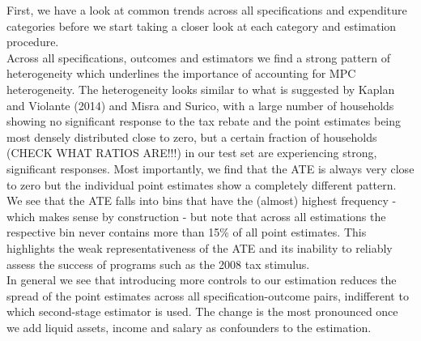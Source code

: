 First, we have a look at common trends across all specifications and expenditure categories before we start taking a closer look at each category and estimation procedure. \\
Across all specifications, outcomes and estimators we find a strong pattern of heterogeneity which underlines the importance of accounting for MPC heterogeneity. The heterogeneity looks similar to what is suggested by Kaplan and Violante (2014) and Misra and Surico, with a large number of households showing no significant response to the tax rebate and the point estimates being most densely distributed close to zero, but a certain fraction of households (CHECK WHAT RATIOS ARE!!!) in our test set are experiencing strong, significant responses. Most importantly, we find that the ATE is always very close to zero but the individual point estimates show a completely different pattern. We see that the ATE falls into bins that have the (almost) highest frequency - which makes sense by construction - but note that across all estimations the respective bin never contains more than 15\% of all point estimates. This highlights the weak representativeness of the ATE and its inability to reliably assess the success of programs such as the 2008 tax stimulus. \\
In general we see that introducing more controls to our estimation reduces the spread of the point estimates across all specification-outcome pairs, indifferent to which second-stage estimator is used. The change is the most pronounced once we add liquid assets, income and salary as confounders to the estimation. \\
